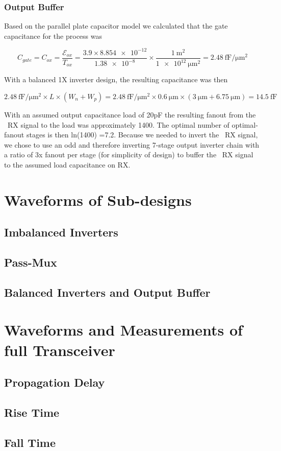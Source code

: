 \documentclass[12pt, letterpaper]{article}
\begin{document}
\subsubsection{Output Buffer}
Based on the parallel plate capacitor model we calculated that the gate capacitance for the process was

$$
C_{gate} = C_{ox} = \frac{\mathcal{E}_{ox}}{T_{ox}} =
\frac{3.9 \times \num{8.854e-12}}{\num{1.38e-8}} \times
\frac{\SI{1}{\meter\squared}}{\SI{1e12}{\micro\meter\squared}} =
\SI{2.48}{\femto\farad\per\micro\meter\squared}
$$

With a balanced 1X inverter design, the resulting capacitance was then

$$
\SI{2.48}{\femto\farad\per\micro\meter\squared} \times L \times (W_n + W_p) =
\SI{2.48}{\femto\farad\per\micro\meter\squared} \times \SI{0.6}{\micro\meter} \times (\SI{3}{\micro\meter} + \SI{6.75}{\micro\meter}) =
\SI{14.5}{\femto\farad}
$$

With an assumed output capacitance load of 20pF the resulting fanout from the ~RX signal to the load was approximately 1400.
The optimal number of optimal-fanout stages is then ln(1400) =7.2.
Because we needed to invert the ~RX signal, we chose to use an odd and therefore inverting 7-stage output inverter chain with a ratio of 3x fanout per stage (for simplicity of design) to buffer the ~RX signal to the assumed load capacitance on RX.

\section{Waveforms of Sub-designs}
\subsection{Imbalanced Inverters}
\subsection{Pass-Mux}
\subsection{Balanced Inverters and Output Buffer}

\section{Waveforms and Measurements of full Transceiver}
\subsection{Propagation Delay}
\subsection{Rise Time}
\subsection{Fall Time}
\end{document}

